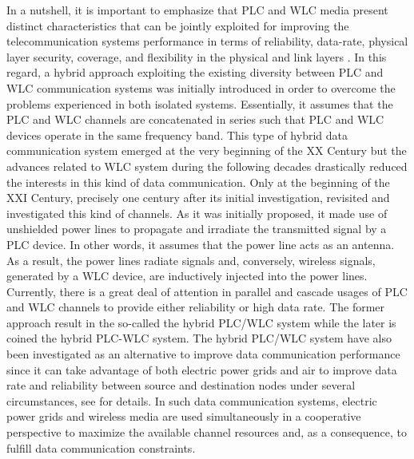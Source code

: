In a nutshell, it is important to emphasize that \ac{PLC} and \ac{WLC} media present distinct characteristics that can be jointly exploited for improving the telecommunication systems performance in terms of reliability, data-rate, physical layer security, coverage, and flexibility in the physical and link layers \cite{Victor2018,Dib,Victor2017,Lai2012,Sayed2015,Holden2011}. In this regard, a hybrid approach exploiting the existing diversity between \ac{PLC} and \ac{WLC} communication systems was initially introduced in order to overcome the problems experienced in both isolated systems. Essentially, it assumes that the \ac{PLC} and \ac{WLC} channels are concatenated in series such that \ac{PLC} and \ac{WLC} devices operate in the same frequency band. This type of hybrid data communication system emerged at the very beginning of the XX Century \cite{Mischa} but the advances related to \ac{WLC} system during the following decades drastically reduced the interests in this kind of data communication. Only at the beginning of the XXI Century, precisely one century after its initial investigation, \cite{thiago:hyb} revisited and investigated this kind of channels. As it was initially proposed, it made use of unshielded power lines to propagate and irradiate the transmitted signal by a \ac{PLC} device. In other words, it assumes that the power line acts as an antenna. As a result, the power lines radiate signals and, conversely, wireless signals, generated by a \ac{WLC} device, are inductively injected into the power lines. Currently, there is a great deal of attention in parallel and cascade usages of \ac{PLC} and \ac{WLC} channels to provide either reliability or high data rate. The former approach result in the so-called the hybrid \ac{PLC}/\ac{WLC} system while the later is coined the hybrid \ac{PLC}-\ac{WLC} system. The hybrid \ac{PLC}/\ac{WLC} system have also been investigated as an alternative to improve data communication performance \cite{Victor2016,Victor2017,Victor2018,Lai2012,Sayed2014,Lai2010,Leo2016} since it can take advantage of both electric power grids and air to improve data rate and reliability between source and destination nodes under several circumstances, see \cite{Dib} for details. In such data communication systems, electric power grids and wireless media are used simultaneously in a cooperative perspective to maximize the available channel resources and, as a consequence, to fulfill data communication constraints.

